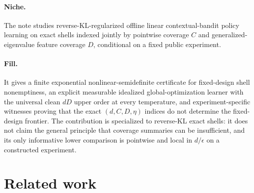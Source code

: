 \documentclass{article}
\begin{document}
\paragraph{Niche.} The note studies reverse-KL-regularized offline linear contextual-bandit policy learning on exact shells indexed jointly by pointwise coverage \(C\) and generalized-eigenvalue feature coverage \(D\), conditional on a fixed public experiment.

\paragraph{Fill.} It gives a finite exponential nonlinear-semidefinite certificate for fixed-design shell nonemptiness, an explicit measurable idealized global-optimization learner with the universal clean \(dD\) upper order at every temperature, and experiment-specific witnesses proving that the exact \((d,C,D,\eta)\) indices do not determine the fixed-design frontier. The contribution is specialized to reverse-KL exact shells: it does not claim the general principle that coverage summaries can be insufficient, and its only informative lower comparison is pointwise and local in \(d/\epsilon\) on a constructed experiment.

\section{Related work}
\end{document}
